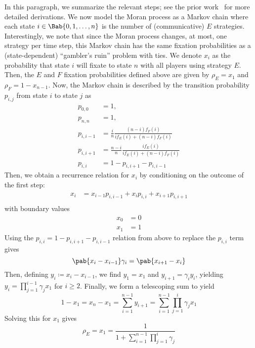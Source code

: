 In this paragraph, we summarize the relevant steps;
see the prior work~\citep{tripp2022evolutionary}
for more detailed derivations.
We now model the Moran process
as a Markov chain where each state $i \in \Bab{0,1,\ldots,n}$
is the number of (communicative) $E$ strategies.
Interestingly, we note that since the Moran process changes, at most,
one strategy per time step,
this Markov chain has the same fixation probabilities
as a (state-dependent) ``gambler's ruin'' problem with ties.
We denote $x_i$ as the probability that state $i$ will fixate
to state $n$ with all players using strategy $E$.
Then, the $E$ and $F$ fixation probabilities defined above are given by
$\rho_E = x_1$ and $\rho_F = 1 - x_{n-1}$.
Now, the Markov chain is described by the transition probability $p_{i,j}$
from state $i$ to state $j$ as
\begin{align*}
  p_{0,0} &= 1, \\
  p_{n,n} &= 1, \\
  p_{i,i-1} &= \frac{i}{n} \frac{(n-i) f_F(i)}{i f_E(i) + (n-i) f_F(i)} \\
  p_{i,i+1} &= \frac{n-i}{n} \frac{i f_E(i)}{i f_E(i) + (n-i) f_F(i)} \\
  p_{i,i} &= 1 - p_{i,i+1} - p_{i,i-1}
\end{align*}
Then, we obtain a recurrence relation for $x_i$ by conditioning
on the outcome of the first step:
\begin{align*}
  x_i &= x_{i-1} p_{i,i-1} + x_i p_{i,i} + x_{i+1} p_{i,i+1} \\
\end{align*}
with boundary values
\begin{align*}
  x_0 &= 0 \\
  x_1 &= 1
\end{align*}
Using the $p_{i,i} = 1 - p_{i,i+1} - p_{i,i-1}$ relation from above
to replace the $p_{i,i}$ term gives
\begin{equation*}
  \pab{x_i - x_{i-1}} \gamma_i = \pab{x_{i+1} - x_i}
\end{equation*}
Then, defining $y_i \coloneqq x_i - x_{i-1}$,
we find $y_1 = x_1$ and $y_{i+1} = \gamma_i y_i$,
yielding $y_i = \prod_{j=1}^{i-1} \gamma_j x_1$ for $i \ge 2$.
Finally, we form a telescoping sum to yield
\begin{equation*}
  1 - x_1 = x_n - x_1
  = \sum_{i=1}^{n-1} y_{i+1}
  = \sum_{i=1}^{n-1} \prod_{j=1}^i \gamma_j x_1
\end{equation*}
Solving this for $x_1$ gives
\begin{equation}
  \rho_E = x_1 = \frac{1}{1 + \sum_{i=1}^{n-1} \prod_{j=1}^i \gamma_j}
  \label{eq:comm_fixation_prob}
\end{equation}
